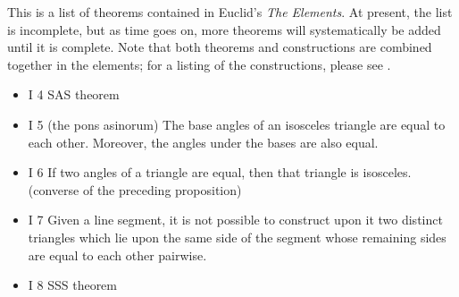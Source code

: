 \documentclass[12pt]{article}
\begin{document}
This is a list of  theorems contained in Euclid's {\em The Elements}.  
At present, the list is incomplete, but as time goes on, more theorems will
systematically be added until it is complete.  Note that both
theorems and constructions are combined together in the elements; for a listing
of the constructions, please see .

\begin{itemize}
\item I 4 SAS theorem
\item I 5 (the pons asinorum)  The base angles of an
isosceles triangle are equal to each other.  Moreover, the angles under 
the bases are also equal.
\item I 6 If two angles of a triangle are equal, then that triangle is
isosceles.  (converse of the preceding proposition)
\item I 7   Given a line segment, it is not possible to construct
upon it two distinct triangles which lie upon the same side of the segment
whose remaining sides are equal to each other pairwise.
\item I 8 SSS theorem
\end{itemize}
\end{document}
